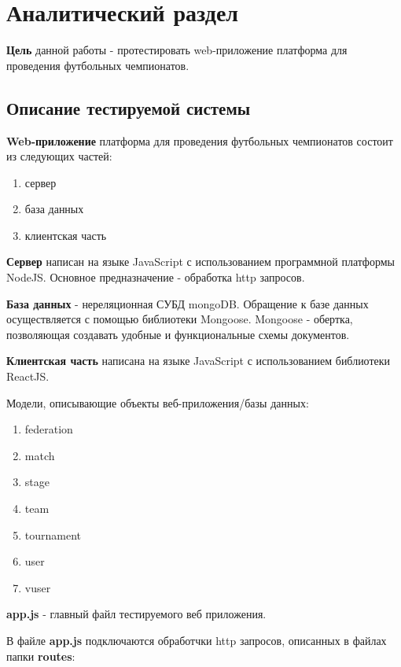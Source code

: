 \chapter{Аналитический раздел}

\textbf{Цель} данной работы - протестировать web-приложение платформа для проведения футбольных чемпионатов.

\section{Описание тестируемой системы}

\textbf{Web-приложение} платформа для проведения футбольных чемпионатов состоит из следующих частей:
\begin{enumerate}
	\item сервер
	\item база данных
	\item клиентская часть
\end{enumerate}

\textbf{Сервер} написан на языке JavaScript с использованием программной платформы NodeJS. Основное предназначение - обработка http запросов.

\textbf{База данных} - нереляционная СУБД mongoDB. Обращение к базе данных осуществляется с помощью библиотеки Mongoose. Mongoose - обертка, позволяющая создавать удобные и функциональные схемы документов. 

\textbf{Клиентская часть} написана на языке JavaScript с использованием библиотеки ReactJS.

Модели, описывающие объекты веб-приложения/базы данных:
\begin{enumerate}
	\item federation
	\item match
	\item stage
	\item team
	\item tournament
	\item user
	\item vuser
\end{enumerate}

\textbf{app.js} - главный файл тестируемого веб приложения.

В файле \textbf{app.js} подключаются обработчки http запросов, описанных в файлах папки \textbf{routes}:

